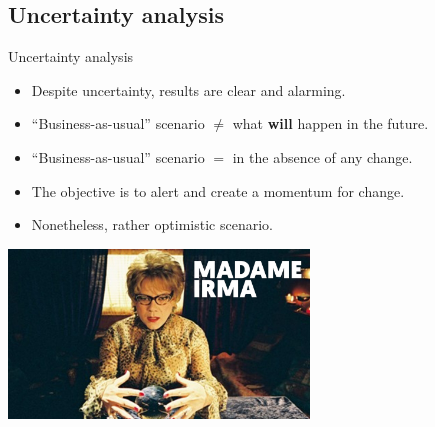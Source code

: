\documentclass[10pt,table,dvipsnames,compress]{beamer}
\begin{document}
\subsection{Uncertainty analysis}
\label{sec:orga11198d}
\begin{frame}[label={sec:orgf0e44a4}]{Uncertainty analysis}
\begin{itemize}
\item Despite uncertainty, results are clear and alarming.
\item ``Business-as-usual'' scenario \(\neq\) what \textbf{will} happen in the
future.
\item ``Business-as-usual'' scenario \(=\) in the absence of any change.
\item The objective is to alert and create a momentum for change.
\item Nonetheless, rather optimistic scenario.
\end{itemize}

\vspace{0.25cm}
\centering \includegraphics[width=0.6\textwidth]{figs/madame-irma}
\end{frame}
\end{document}
